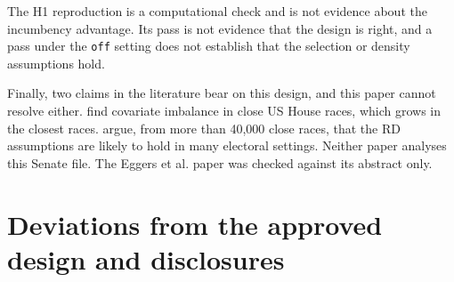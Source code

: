 \documentclass[11pt]{article}
\begin{document}
The H1 reproduction is a computational check and is not evidence about the incumbency advantage. Its pass is not evidence that the design is right, and a pass under the \texttt{off} setting does not establish that the selection or density assumptions hold.

Finally, two claims in the literature bear on this design, and this paper cannot resolve either. \citet{caughey2011elections} find covariate imbalance in close US House races, which grows in the closest races. \citet{eggers2015validity} argue, from more than 40,000 close races, that the RD assumptions are likely to hold in many electoral settings. Neither paper analyses this Senate file. The Eggers et al. paper was checked against its abstract only.

\section{Deviations from the approved design and disclosures}
\end{document}
